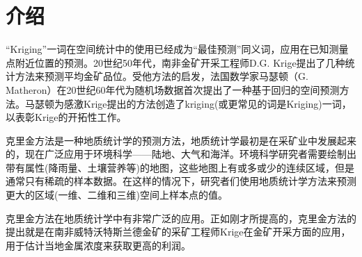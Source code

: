 \section{介绍}
“Kriging”一词在空间统计中的使用已经成为“最佳预测”同义词\textsuperscript{\cite{cressie1990origins}}，应用在已知测量点附近位置的预测。20世纪50年代，南非金矿开采工程师D.G. Krige提出了几种统计方法来预测平均金矿品位。受他方法的启发，法国数学家马瑟顿（G. Matheron）在20世纪60年代为随机场数据首次提出了一种基于回归的空间预测方法。马瑟顿为感激Krige提出的方法创造了kriging(或更常见的词是Kriging)一词，以表彰Krige的开拓性工作\textsuperscript{\cite{lovric2011international}}。

克里金方法是一种地质统计学的预测方法，地质统计学最初是在采矿业中发展起来的，现在广泛应用于环境科学——陆地、大气和海洋\textsuperscript{\cite{oliver2015basic}}。环境科学研究者需要绘制出带有属性(降雨量、土壤营养等)的地图，这些地图上有或多或少的连续区域，但是通常只有稀疏的样本数据。在这样的情况下，研究者们使用地质统计学方法来预测更大的区域(一维、二维和三维)空间上样本点的值。

克里金方法在地质统计学中有非常广泛的应用。正如刚才所提高的，克里金方法的提出就是在南非威特沃特斯兰德金矿的采矿工程师Krige在金矿开采方面的应用，用于估计当地金属浓度来获取更高的利润。